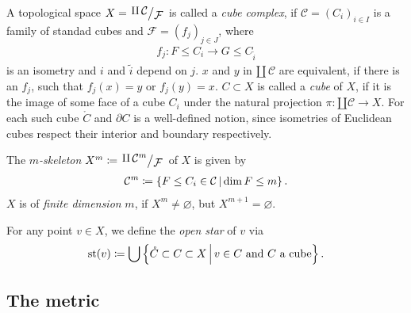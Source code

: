 \begin{defin}
  A topological space \(X = \quot{\amalg\,\mathcal{C}}{\mathcal{F}}\) is called a \emph{cube complex}, if \(\mathcal{C} = {(C_i)}_{i \in I}\) is a family of standad cubes and \(\mathcal{F} = {(f_j)}_{j \in J}\), where
  \begin{align*}
    f_j\colon F \leq C_i \to G \leq C_{\tilde i}
  \end{align*}
  is an isometry and \(i\) and \(\tilde i\) depend on \(j\). \(x\) and \(y\) in \(\amalg\,\mathcal{C}\) are equivalent, if there is an \(f_j\), such that \(f_j(x) = y\) or \(f_j(y) = x\). \(C \subset X\) is called a \emph{cube} of \(X\), if it is the image of some face of a cube \(C_i\) under the natural projection \(\pi \colon \amalg \mathcal{C} \to X\). For each such cube \(\mathring {C}\) and \(\partial C\) is a well-defined notion, since isometries of Euclidean cubes respect their interior and boundary respectively.

  The \emph{\(m\)-skeleton} \(X^m \coloneqq \quot{\amalg\,\mathcal{C}^m}{\mathcal{F}}\) of \(X\) is given by
  \begin{align*}
    \mathcal{C}^m \coloneqq \left\{F \leq C_i \in \mathcal{C} \,\middle|\, \dim F \leq m\right\}.
  \end{align*}
  \(X\) is of \emph{finite dimension} \(m\), if \(X^m \neq \varnothing\), but \(X^{m+1} = \varnothing\).

  For any point \(v \in X\), we define the \emph{open star} of \(v\) via
  \begin{align*}
    \operatorname{st}(v) \coloneqq \bigcup \left\{\mathring{C} \subset C \subset X \,\middle|\, v \in C \text{ and } C \text{ a cube} \right\}.
  \end{align*}
\end{defin}

\begin{bsp}
\end{bsp}

\subsection{The metric}
\label{sec:metric}

